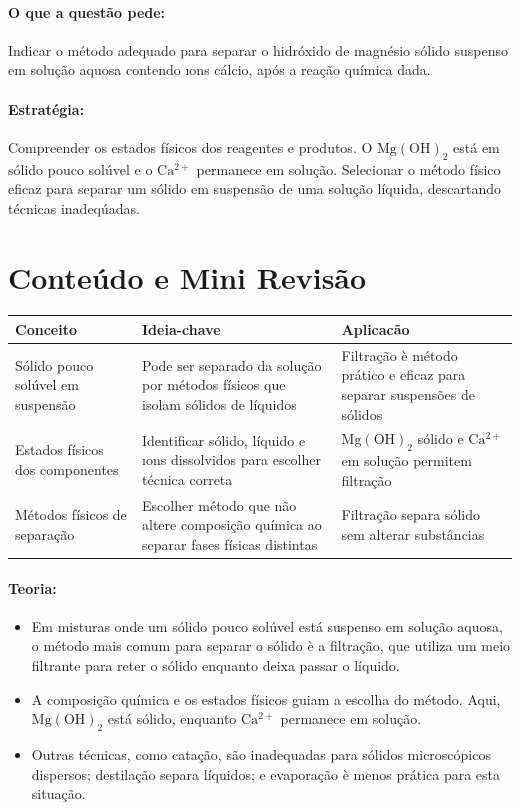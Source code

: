 \documentclass{article}
\begin{document}
\paragraph{O que a questão pede:}
Indicar o método adequado para separar o hidróxido de magnésio sólido suspenso em solução aquosa contendo \i{ons} cálcio, após a reação química dada.

\paragraph{Estratégia:}
Compreender os estados físicos dos reagentes e produtos. O $\mathrm{Mg(OH)_2}$ está em sólido pouco solúvel e o $\mathrm{Ca^{2+}}$ permanece em solução. Selecionar o método físico eficaz para separar um sólido em suspensão de uma solução líquida, descartando técnicas inadeqúadas.

\section*{Conteúdo e Mini Revisão}
\begin{tabular}{|p{5cm}|p{6cm}|p{5cm}|}
\hline
\textbf{Conceito} & \textbf{Ideia-chave} & \textbf{Aplicacão} \\
\hline
Sólido pouco solúvel em suspensão & Pode ser separado da solução por métodos físicos que isolam sólidos de líquidos & Filtração \`e método prático e eficaz para separar suspensões de sólidos \\
\hline
Estados físicos dos componentes & Identificar sólido, líquido e \i{ons} dissolvidos para escolher técnica correta & $\mathrm{Mg(OH)_2}$ sólido e $\mathrm{Ca^{2+}}$ em solução permitem filtração \\
\hline
Métodos físicos de separação & Escolher método que não altere composição química ao separar fases físicas distintas & Filtração separa sólido sem alterar substâncias \\
\hline
\end{tabular}

\paragraph{Teoria:}
\begin{itemize}
\item Em misturas onde um sólido pouco solúvel está suspenso em solução aquosa, o método mais comum para separar o sólido \`e a filtração, que utiliza um meio filtrante para reter o sólido enquanto deixa passar o líquido.
\item A composição química e os estados físicos guiam a escolha do método. Aqui, $\mathrm{Mg(OH)_2}$ está sólido, enquanto $\mathrm{Ca^{2+}}$ permanece em solução.
\item Outras técnicas, como catação, são inadequadas para sólidos microscópicos dispersos; destilação separa líquidos; e evaporação \`e menos prática para esta situação.
\end{itemize}
\end{document}

